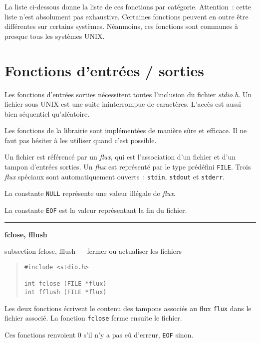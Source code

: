 \documentclass [twoside] {report}
\newcommand {\primitive} [1]
    {
	{\large \bf #1}
	\addcontentsline {toc} {subsection} {#1}
    }
\newcommand {\separation}
    {
	\vspace {7mm}
	\nopagebreak
	\hrule
    }
\begin{document}
La liste ci-dessous donne la liste de ces fonctions par
catégorie. Attention~: cette liste n'est absolument pas
exhaustive. Certaines fonctions peuvent en outre être
différentes sur certains systèmes. Néanmoins, ces fonctions
sont communes à presque tous les systèmes UNIX.



\section {Fonctions d'entrées / sorties}


Les fonctions d'entrées sorties nécessitent toutes
l'inclusion du fichier {\em stdio.h}. Un fichier sous UNIX est
une suite ininterrompue de caractères. L'accès est aussi
bien séquentiel qu'aléatoire.

Les fonctions de la librairie sont implémentées de manière
sûre et efficace. Il ne faut pas hésiter à les utiliser
quand c'est possible.

Un fichier est référencé par un {\em flux}, qui est
l'association d'un fichier et d'un tampon d'entrées sorties.
Un {\em flux} est représenté par le type prédéfini {\tt FILE}. Trois
{\em flux} spéciaux sont automatiquement ouverts~: {\tt stdin},
{\tt stdout} et {\tt stderr}.

La constante {\tt NULL} représente une valeur illégale de
{\em flux}.

La constante {\tt EOF} est la valeur représentant la fin du
fichier.


\separation
\primitive {fclose, fflush} --- fermer ou actualiser les fichiers

\begin {quote}
\begin {verbatim}
#include <stdio.h>

int fclose (FILE *flux)
int fflush (FILE *flux)
\end{verbatim}
\end {quote}


Les deux fonctions écrivent le contenu des tampons associés
au flux {\tt flux} dans le fichier associé. La fonction
{\tt fclose} ferme ensuite le fichier.

Ces fonctions renvoient 0 s'il n'y a pas eû d'erreur,
{\tt EOF} sinon.
\end{document}
